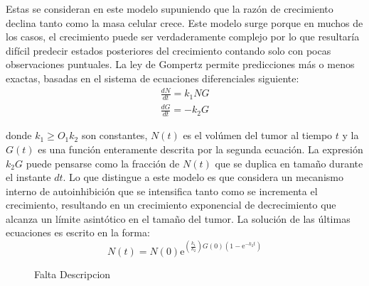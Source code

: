 Estas se consideran en este modelo supuniendo que la razón de crecimiento declina tanto como la masa celular crece. Este modelo surge porque en muchos de los casos, el crecimiento puede ser verdaderamente complejo por lo que resultaría difícil predecir estados posteriores del crecimiento contando solo con pocas observaciones puntuales. La ley de Gompertz permite predicciones más o menos exactas, basadas en el sistema de ecuaciones diferenciales siguiente:
\begin{equation}
    \begin{split}
        \frac{dN}{dt} = k_{1}NG\\
        \frac{dG}{dt} = -k_{2}G
    \end{split}
\end{equation}

donde $k_{1} \geq O_{1}k_{2}$ son constantes, $N(t)$ es el vol\'umen del tumor al tiempo $t$ y la $G(t)$ es una funci\'on enteramente descrita por la segunda ecuaci\'on. La expresión $k_{2}G$ puede pensarse como la fracción de $N(t)$ que se duplica en tamaño durante el instante $dt$. Lo que distingue a este modelo es que considera un mecanismo interno de autoinhibición que se intensifica tanto como se incrementa el crecimiento, resultando en un crecimiento exponencial de decrecimiento que alcanza un límite asintótico en el tamaño del tumor. La solución de las últimas ecuaciones es escrito en la forma:
\begin{equation}
    N(t) = N(0) \mathrm{e}^{(\frac{k_{1}}{k_{2}})G(0)(1 - \mathrm{e}^{-k_{2}t})}
\end{equation}

\begin{figure}[!ht]
\begin{center}
\end{center}\vspace*{-0.6cm}
\caption[Imagen de Oncogenes. Falta poner leyenda]{Falta Descripcion}
\label{fig-gompertz}
\end{figure}
\newpage

